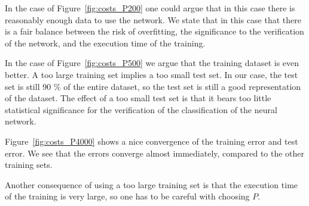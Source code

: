 In the case of Figure~\ref{fig:costs_P200} one could argue that in this case there is reasonably enough data to use the network.
We state that in this case that there is a fair balance between the risk of overfitting, the significance to the verification of the network, and the execution time of the training.

In the case of Figure~\ref{fig:costs_P500} we argue that the training dataset is even better.
A too large training set implies a too small test set.
In our case, the test set is still 90 \% of the entire dataset, so the test set is still a good representation of the dataset.
The effect of a too small test set is that it bears too little statistical significance for the verification of the classification of the neural network.

Figure~\ref{fig:costs_P4000} shows a nice convergence of the training error and test error.
We see that the errors converge almost immediately, compared to the other training sets.

Another consequence of using a too large training set is that the execution time of the training is very large, so one has to be careful with choosing \(P\).